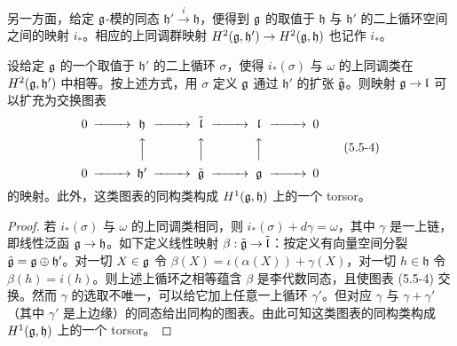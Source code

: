 另一方面，给定 $\mathfrak{g}$-模的同态 $\mathfrak{h}'\xrightarrow{i}\mathfrak{h}$，便得到 $\mathfrak{g}$ 的取值于 $\mathfrak{h}$ 与 $\mathfrak{h}'$ 的二上循环空间之间的映射 $i_*$。相应的上同调群映射 $H^2(\mathfrak{g},\mathfrak{h}')\to H^2(\mathfrak{g},\mathfrak{h})$ 也记作 $i_*$。

\begin{lemma}
设给定 $\mathfrak{g}$ 的一个取值于 $\mathfrak{h}'$ 的二上循环 $\sigma$，使得 $i_*(\sigma)$ 与 $\omega$ 的上同调类在 $H^2(\mathfrak{g},\mathfrak{h}')$ 中相等。按上述方式，用 $\sigma$ 定义 $\mathfrak{g}$ 通过 $\mathfrak{h}'$ 的扩张 $\tilde{\mathfrak{g}}$。则映射 $\mathfrak{g}\to\mathfrak{l}$ 可以扩充为交换图表
\begin{equation}
\begin{CD}
0 @>>> \fh @>>> \tilde{\mathfrak{l}} @>>> \mathfrak{l} @>>> 0\\
@. @AAA @AAA @AAA @.\\
0 @>>> \fh' @>>> \tilde{\fg} @>>> \fg @>>> 0
\end{CD}
\tag{5.5-4}
\end{equation}
的映射。此外，这类图表的同构类构成 $H^1(\mathfrak{g},\mathfrak{h})$ 上的一个 torsor。
\end{lemma}

\begin{proof}
若 $i_*(\sigma)$ 与 $\omega$ 的上同调类相同，则 $i_*(\sigma)+d\gamma = \omega$，其中 $\gamma$ 是一上链，即线性泛函 $\mathfrak{g}\to\mathfrak{h}$。如下定义线性映射 $\beta:\tilde{\mathfrak{g}}\to\tilde{\mathfrak{l}}$：按定义有向量空间分裂 $\tilde{\mathfrak{g}} = \mathfrak{g}\oplus\mathfrak{h}'$。对一切 $X\in\mathfrak{g}$ 令 $\beta(X) = \iota(\alpha(X))+\gamma(X)$，对一切 $h\in\mathfrak{h}$ 令 $\beta(h) = i(h)$。则上述上循环之相等蕴含 $\beta$ 是李代数同态，且使图表 (5.5-4) 交换。然而 $\gamma$ 的选取不唯一，可以给它加上任意一上循环 $\gamma'$。但对应 $\gamma$ 与 $\gamma+\gamma'$（其中 $\gamma'$ 是上边缘）的同态给出同构的图表。由此可知这类图表的同构类构成 $H^1(\mathfrak{g},\mathfrak{h})$ 上的一个 torsor。
\end{proof}

